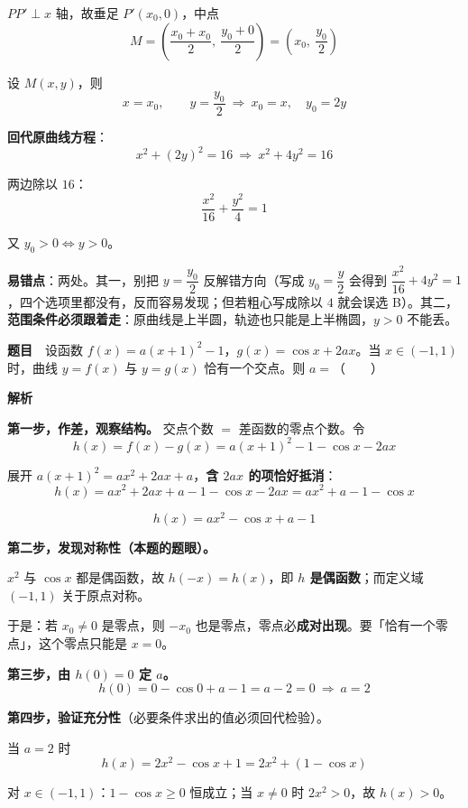 $PP'\perp x$ 轴，故垂足 $P'\left(x_0,0\right)$，中点
\[M=\left(\frac{x_0+x_0}2,\ \frac{y_0+0}2\right)=\left(x_0,\ \frac{y_0}2\right)\]

设 $M(x,y)$，则
\[x=x_0,\qquad y=\frac{y_0}2\ \Longrightarrow\ x_0=x,\quad y_0=2y\]

\textbf{回代原曲线方程}：
\[x^{2}+(2y)^{2}=16\ \Longrightarrow\ x^{2}+4y^{2}=16\]

两边除以 $16$：
\[\frac{x^{2}}{16}+\frac{y^{2}}4=1\]

又 $y_0>0\iff y>0$。


\begin{gktip}
\textbf{易错点}：两处。其一，别把 $y=\dfrac{y_0}2$ 反解错方向（写成 $y_0=\dfrac y2$ 会得到 $\dfrac{x^2}{16}+4y^2=1$，四个选项里都没有，反而容易发现；但若粗心写成除以 $4$ 就会误选 B）。其二，\textbf{范围条件必须跟着走}：原曲线是上半圆，轨迹也只能是上半椭圆，$y>0$ 不能丢。
\end{gktip}

\par\medskip


\textbf{题目}　设函数 $f(x)=a(x+1)^{2}-1$，$g(x)=\cos x+2ax$。当 $x\in(-1,1)$ 时，曲线 $y=f(x)$ 与 $y=g(x)$ 恰有一个交点。则 $a=$（　　）

\textbf{解析}

\textbf{第一步，作差，观察结构。} 交点个数 $=$ 差函数的零点个数。令
\[h(x)=f(x)-g(x)=a(x+1)^{2}-1-\cos x-2ax\]

展开 $a(x+1)^{2}=ax^{2}+2ax+a$，\textbf{含 $2ax$ 的项恰好抵消}：
\[h(x)=ax^{2}+2ax+a-1-\cos x-2ax=ax^{2}+a-1-\cos x\]

\[\boxed{h(x)=ax^{2}-\cos x+a-1}\]

\textbf{第二步，发现对称性（本题的题眼）。}

$x^{2}$ 与 $\cos x$ 都是偶函数，故 $h(-x)=h(x)$，即 \textbf{$h$ 是偶函数}；而定义域 $(-1,1)$ 关于原点对称。

于是：若 $x_0\ne0$ 是零点，则 $-x_0$ 也是零点，零点必\textbf{成对出现}。要「恰有一个零点」，这个零点只能是 $x=0$。

\textbf{第三步，由 $h(0)=0$ 定 $a$。}
\[h(0)=0-\cos0+a-1=a-2=0\ \Longrightarrow\ a=2\]

\textbf{第四步，验证充分性}（必要条件求出的值必须回代检验）。

当 $a=2$ 时
\[h(x)=2x^{2}-\cos x+1=2x^{2}+(1-\cos x)\]

对 $x\in(-1,1)$：$1-\cos x\ge0$ 恒成立；当 $x\ne0$ 时 $2x^{2}>0$，故 $h(x)>0$。

